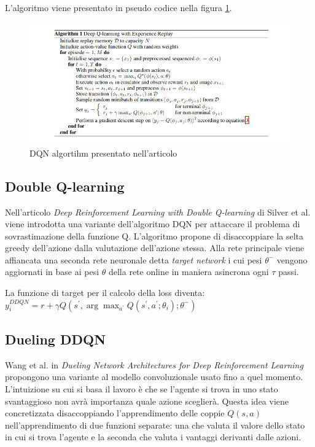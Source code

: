 \documentclass{article}
\begin{document}
		L'algoritmo viene presentato in pseudo codice nella figura \ref{fig:dqn_algo}.

		\begin{figure}[H]
			\centering
			\includegraphics[width=\linewidth]{dqnalgo.png}
			\caption{DQN algortihm presentato nell'articolo \cite{nature_dqn}}
			\label{fig:dqn_algo}
		\end{figure}

	\subsection{Double Q-learning}
		Nell'articolo \textit{Deep Reinforcement Learning with Double Q-learning} di Silver et al. viene introdotta una variante dell'algoritmo DQN per attaccare il problema di sovrastimazione della funzione Q. L'algoritmo propone di disaccoppiare la selta greedy dell'azione dalla valutazione dell'azione stessa. Alla rete principale viene affiancata una seconda rete neuronale detta \textit{target network} i cui pesi $\theta^{-}$ vengono aggiornati in base ai pesi $\theta$ della rete online in maniera asincrona ogni $\tau$ passi.

		La funzione di target per il calcolo della loss diventa:\\

		$y_{i}^{D D Q N}=r+\gamma Q\left(s^{\prime}, \arg \max _{a^{\prime}} Q\left(s^{\prime}, a^{\prime} ; \theta_{i}\right) ; \theta^{-}\right)$

	\subsection{Dueling DDQN}
		Wang et al. in \textit{Dueling Network Architectures for Deep Reinforcement Learning} \cite{1511.06581} propongono una variante al modello convoluzionale usato fino a quel momento. L'intuizione su cui si basa il lavoro è che se l'agente si trova in uno stato svantaggioso non avrà importanza quale azione sceglierà. Questa idea viene concretizzata disaccoppiando l'apprendimento delle coppie $Q\left(s, a\right)$ nell'apprendimento di due funzioni separate: una che valuta il valore dello stato in cui si trova l'agente e la seconda che valuta i vantaggi derivanti dalle azioni.
\end{document}
